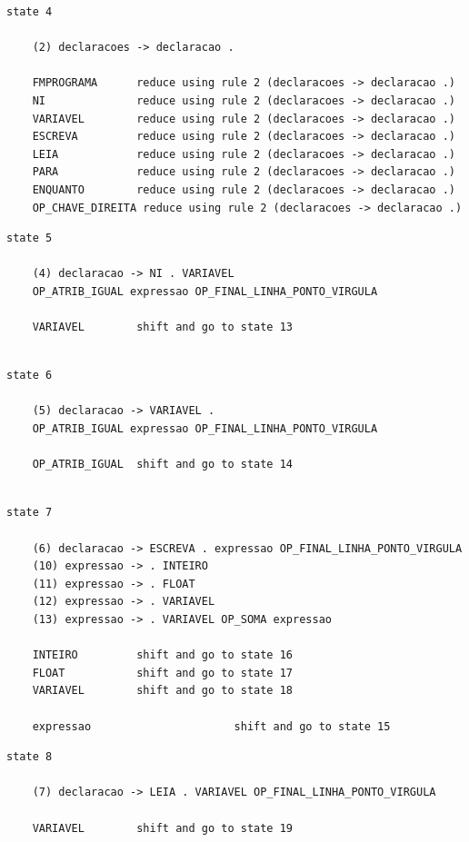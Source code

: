 \documentclass[a4paper,12pt]{article}
\begin{document}
\begin{verbatim}
state 4

    (2) declaracoes -> declaracao .

    FMPROGRAMA      reduce using rule 2 (declaracoes -> declaracao .)
    NI              reduce using rule 2 (declaracoes -> declaracao .)
    VARIAVEL        reduce using rule 2 (declaracoes -> declaracao .)
    ESCREVA         reduce using rule 2 (declaracoes -> declaracao .)
    LEIA            reduce using rule 2 (declaracoes -> declaracao .)
    PARA            reduce using rule 2 (declaracoes -> declaracao .)
    ENQUANTO        reduce using rule 2 (declaracoes -> declaracao .)
    OP_CHAVE_DIREITA reduce using rule 2 (declaracoes -> declaracao .)

\end{verbatim}

\begin{verbatim}
state 5

    (4) declaracao -> NI . VARIAVEL 
    OP_ATRIB_IGUAL expressao OP_FINAL_LINHA_PONTO_VIRGULA

    VARIAVEL        shift and go to state 13
    
\end{verbatim}

\begin{verbatim}
state 6

    (5) declaracao -> VARIAVEL . 
    OP_ATRIB_IGUAL expressao OP_FINAL_LINHA_PONTO_VIRGULA

    OP_ATRIB_IGUAL  shift and go to state 14
    
\end{verbatim}

\begin{verbatim}
state 7

    (6) declaracao -> ESCREVA . expressao OP_FINAL_LINHA_PONTO_VIRGULA
    (10) expressao -> . INTEIRO
    (11) expressao -> . FLOAT
    (12) expressao -> . VARIAVEL
    (13) expressao -> . VARIAVEL OP_SOMA expressao

    INTEIRO         shift and go to state 16
    FLOAT           shift and go to state 17
    VARIAVEL        shift and go to state 18

    expressao                      shift and go to state 15

\end{verbatim}

\begin{verbatim}
state 8

    (7) declaracao -> LEIA . VARIAVEL OP_FINAL_LINHA_PONTO_VIRGULA

    VARIAVEL        shift and go to state 19
\end{verbatim}
\end{document}
